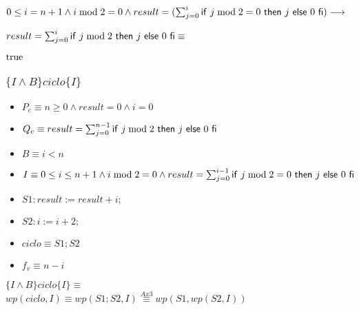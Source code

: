 \documentclass{article}
\begin{document}
$0 \leq i = n+1 \wedge i \bmod 2 = 0 \wedge result = (\sum_{j=0}^{i} \mathsf{if}\ j \bmod 2 = 0\ \mathsf{then}\ j\ \mathsf{else}\ 0\ \mathsf{fi}) \longrightarrow$

$result = \sum_{j=0}^{i} \mathsf{if}\ j \bmod 2\ \mathsf{then}\ j\ \mathsf{else}\ 0\ \mathsf{fi} \equiv$

$\mathrm{true}$

\subsubsection*{$\{I \wedge B\}  ciclo  \{ I \}$}

\begin{itemize}
    \item $P_{c} \equiv n \geq 0 \wedge result = 0 \wedge i = 0$
    \item $Q_{c} \equiv result = \sum_{j=0}^{n-1} \mathsf{if}\ j \bmod 2\ \mathsf{then}\ j\ \mathsf{else}\ 0\ \mathsf{fi}$
    \item $B \equiv i < n$
    \item $I \equiv 0 \leq i \leq n+1 \wedge i \bmod 2 = 0 \wedge result = \sum_{j=0}^{i-1} \mathsf{if}\ j \bmod 2 = 0\ \mathsf{then}\ j\ \mathsf{else}\ 0\ \mathsf{fi}$
    \item $S1: result := result + i;$
    \item $S2: i := i + 2;$
    \item $ciclo \equiv S1; S2$
    \item $f_{v} \equiv n-i$
\end{itemize}

$\{I \wedge B\} ciclo \{ I \} \equiv$ \\

$wp(ciclo, I) \equiv wp(S1;S2,I) \stackrel{Ax3}{\equiv} wp(S1, wp(S2, I))$
\end{document}
